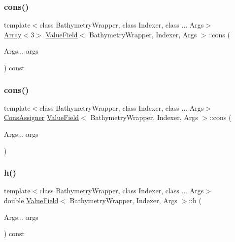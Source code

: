 \subsubsection{\texorpdfstring{cons()}{cons()}\hspace{0.1cm}{\footnotesize\ttfamily [1/2]}}
{\footnotesize\ttfamily template$<$class Bathymetry\+Wrapper, class Indexer, class ... Args$>$ \\
\hyperlink{Includes_8h_abd9de33944f934950000c3929e14ad8d}{Array}$<$3$>$ \hyperlink{structValueField}{Value\+Field}$<$ Bathymetry\+Wrapper, Indexer, Args $>$\+::cons (\begin{DoxyParamCaption}\item[{Args...}]{args }\end{DoxyParamCaption}) const\hspace{0.3cm}{\ttfamily [inline]}}

\mbox{\label{structValueField_acc5a82555db3c342d9e324b34e5f6173}} 
\subsubsection{\texorpdfstring{cons()}{cons()}\hspace{0.1cm}{\footnotesize\ttfamily [2/2]}}
{\footnotesize\ttfamily template$<$class Bathymetry\+Wrapper, class Indexer, class ... Args$>$ \\
\hyperlink{structConsAssigner}{Cons\+Assigner} \hyperlink{structValueField}{Value\+Field}$<$ Bathymetry\+Wrapper, Indexer, Args $>$\+::cons (\begin{DoxyParamCaption}\item[{Args...}]{args }\end{DoxyParamCaption})\hspace{0.3cm}{\ttfamily [inline]}}

\mbox{\label{structValueField_a8b7f79bee998cd8ad2f44d0971fa9131}} 
\subsubsection{\texorpdfstring{h()}{h()}}
{\footnotesize\ttfamily template$<$class Bathymetry\+Wrapper, class Indexer, class ... Args$>$ \\
double \hyperlink{structValueField}{Value\+Field}$<$ Bathymetry\+Wrapper, Indexer, Args $>$\+::h (\begin{DoxyParamCaption}\item[{Args...}]{args }\end{DoxyParamCaption}) const\hspace{0.3cm}{\ttfamily [inline]}}


